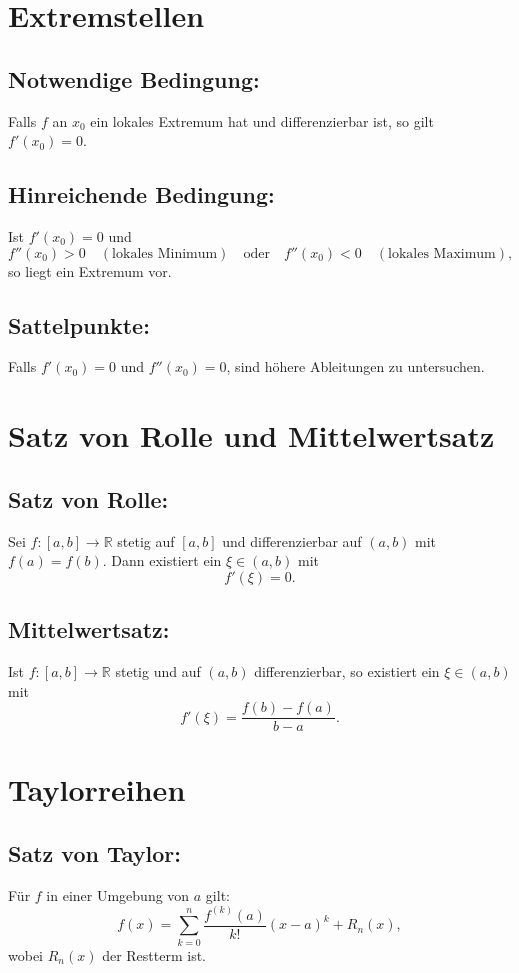 \documentclass[12pt]{article}
\begin{document}
\section{Extremstellen}
\subsection*{Notwendige Bedingung:}
Falls \( f \) an \( x_0 \) ein lokales Extremum hat und differenzierbar ist, so gilt \( f'(x_0)=0 \).
\subsection*{Hinreichende Bedingung:}
Ist \( f'(x_0)=0 \) und
\[
f''(x_0) > 0 \quad (\text{lokales Minimum}) \quad \text{oder} \quad f''(x_0) < 0 \quad (\text{lokales Maximum}),
\]
so liegt ein Extremum vor.
\subsection*{Sattelpunkte:}
Falls \( f'(x_0)=0 \) und \( f''(x_0)=0 \), sind höhere Ableitungen zu untersuchen.

\section{Satz von Rolle und Mittelwertsatz}
\subsection*{Satz von Rolle:}
Sei \( f:[a,b]\to\mathbb{R} \) stetig auf \( [a,b] \) und differenzierbar auf \( (a,b) \) mit \( f(a)=f(b) \). Dann existiert ein \( \xi \in (a,b) \) mit
\[
f'(\xi)=0.
\]
\subsection*{Mittelwertsatz:}
Ist \( f:[a,b] \to \mathbb{R} \) stetig und auf \( (a,b) \) differenzierbar, so existiert ein \( \xi \in (a,b) \) mit
\[
f'(\xi) = \frac{f(b)-f(a)}{b-a}.
\]

\section{Taylorreihen}
\subsection*{Satz von Taylor:}
Für \( f \) in einer Umgebung von \( a \) gilt:
\[
f(x) = \sum_{k=0}^{n} \frac{f^{(k)}(a)}{k!}(x-a)^k + R_n(x),
\]
wobei \( R_n(x) \) der Restterm ist.
\end{document}
